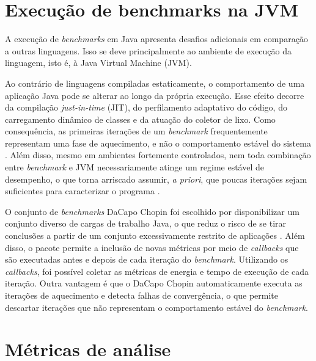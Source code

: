 \section{Execução de benchmarks na JVM}

A execução de \textit{benchmarks} em Java apresenta desafios adicionais em
comparação a outras linguagens. Isso se deve principalmente ao ambiente de
execução da linguagem, isto é, à Java Virtual Machine (JVM).

Ao contrário de linguagens compiladas estaticamente, o comportamento de uma
aplicação Java pode se alterar ao longo da própria execução. Esse efeito
decorre da compilação \textit{just-in-time} (JIT), do perfilamento adaptativo
do código, do carregamento dinâmico de classes e da atuação do coletor de lixo.
Como consequência, as primeiras iterações de um \textit{benchmark}
frequentemente representam uma fase de aquecimento, e não o comportamento
estável do sistema \cite{vms-hot-and-cold, steady-state-assessment}. Além
disso, mesmo em ambientes fortemente controlados, nem toda combinação entre
\textit{benchmark} e JVM necessariamente atinge um regime estável de
desempenho, o que torna arriscado assumir, \textit{a priori}, que poucas
iterações sejam suficientes para caracterizar o programa
\cite{vms-hot-and-cold}.

O conjunto de \textit{benchmarks} DaCapo Chopin foi escolhido por disponibilizar um conjunto diverso de cargas
de trabalho Java, o que reduz o risco de se tirar conclusões a partir de um
conjunto excessivamente restrito de aplicações \cite{dacapochopin}. Além disso, 
o pacote permite a inclusão de novas métricas por meio de \textit{callbacks} que são 
executadas antes e depois de cada iteração do \textit{benchmark}. Utilizando os 
\textit{callbacks}, foi possível coletar as métricas de energia e tempo de execução de cada iteração. 
Outra vantagem é que o DaCapo Chopin automaticamente executa as iterações de aquecimento e detecta 
falhas de convergência, o que permite descartar iterações que não representam o comportamento estável do \textit{benchmark}.

\section{Métricas de análise}

